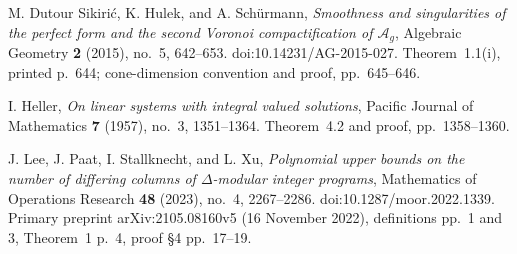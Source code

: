M. Dutour Sikiri\'c, K. Hulek, and A. Sch\"urmann,
\emph{Smoothness and singularities of the perfect form and the second
Voronoi compactification of $\mathcal A_g$},
Algebraic Geometry \textbf{2} (2015), no.~5, 642--653.
doi:10.14231/AG-2015-027.
Theorem~1.1(i), printed p.~644; cone-dimension convention and proof,
pp.~645--646.

I. Heller, \emph{On linear systems with integral valued solutions},
Pacific Journal of Mathematics \textbf{7} (1957), no.~3, 1351--1364.
Theorem~4.2 and proof, pp.~1358--1360.

J. Lee, J. Paat, I. Stallknecht, and L. Xu,
\emph{Polynomial upper bounds on the number of differing columns of
$\Delta$-modular integer programs},
Mathematics of Operations Research \textbf{48} (2023), no.~4, 2267--2286.
doi:10.1287/moor.2022.1339.
Primary preprint arXiv:2105.08160v5 (16 November 2022),
definitions pp.~1 and 3, Theorem~1 p.~4, proof \S4 pp.~17--19.
